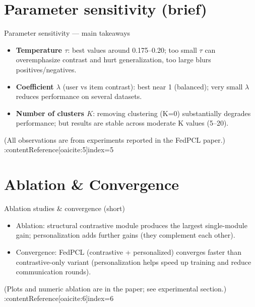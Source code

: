 \documentclass{beamer}
\begin{document}
\section{Parameter sensitivity (brief)}
\begin{frame}{Parameter sensitivity — main takeaways}
  \begin{itemize}
    \item \textbf{Temperature $\tau$}: best values around 0.175--0.20; too small $\tau$ can overemphasize contrast and hurt generalization, too large blurs positives/negatives.
    \item \textbf{Coefficient $\lambda$} (user vs item contrast): best near 1 (balanced); very small $\lambda$ reduces performance on several datasets.
    \item \textbf{Number of clusters $K$}: removing clustering (K=0) substantially degrades performance; but results are stable across moderate K values (5--20).
  \end{itemize}
  (All observations are from experiments reported in the FedPCL paper.) :contentReference[oaicite:5]{index=5}
\end{frame}

\section{Ablation \& Convergence}
\begin{frame}{Ablation studies \& convergence (short)}
  \begin{itemize}
    \item Ablation: structural contrastive module produces the largest single-module gain; personalization adds further gains (they complement each other).
    \item Convergence: FedPCL (contrastive + personalized) converges faster than contrastive-only variant (personalization helps speed up training and reduce communication rounds).
  \end{itemize}
  (Plots and numeric ablation are in the paper; see experimental section.) :contentReference[oaicite:6]{index=6}
\end{frame}

\end{document}
